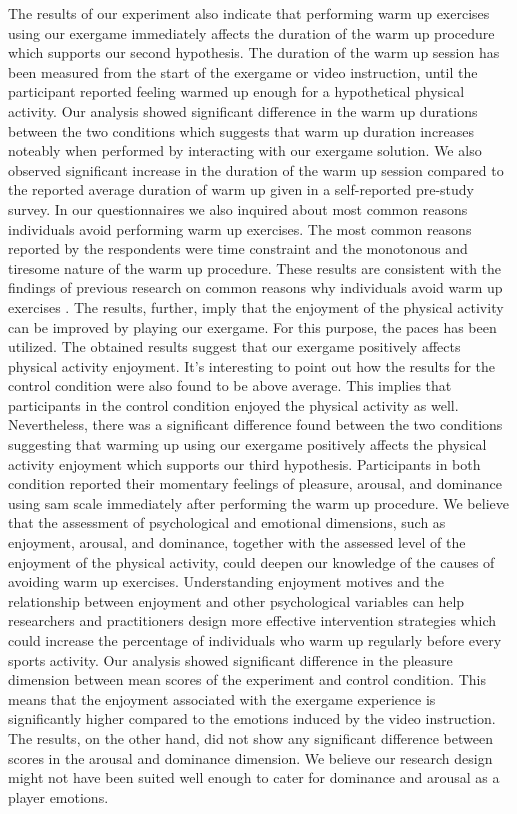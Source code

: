 The results of our experiment also indicate that performing warm up exercises using our exergame immediately affects the duration of the warm up procedure which supports our second hypothesis. The duration of the warm up session has been measured from the start of the exergame or video instruction, until the participant reported feeling warmed up enough for a hypothetical physical activity. Our analysis showed significant difference in the warm up durations between the two conditions which suggests that warm up duration increases noteably when performed by interacting with our exergame solution. We also observed significant increase in the duration of the warm up session compared to the reported average duration of warm up given in a self-reported pre-study survey. In our questionnaires we also inquired about most common reasons individuals avoid performing warm up exercises. The most common reasons reported by the respondents were time constraint and the monotonous and tiresome nature of the warm up procedure. These results are consistent with the findings of previous research on common reasons why individuals avoid warm up exercises \cite{fradkin2010effects}. The results, further, imply that the enjoyment of the physical activity can be improved by playing our exergame. For this purpose, the \acrlong{paces} has been utilized. The obtained results suggest that our exergame positively affects physical activity enjoyment. It's interesting to point out how the results for the control condition were also found to be above average. This implies that participants in the control condition enjoyed the physical activity as well.  Nevertheless, there was a significant difference found between the two conditions suggesting that warming up using our exergame positively affects the physical activity enjoyment which supports our third hypothesis. Participants  in both condition reported their momentary feelings of pleasure, arousal, and dominance using  \acrlong{sam} scale immediately after performing the warm up procedure. We believe that the assessment of psychological and emotional dimensions, such as enjoyment, arousal, and dominance, together with the assessed level of the enjoyment of the physical activity, could deepen our knowledge of the causes of avoiding warm up exercises. Understanding enjoyment motives and the relationship between enjoyment and other psychological variables can help researchers and practitioners design more effective intervention strategies which could increase the percentage of individuals who warm up regularly before every sports activity. Our analysis showed significant difference in the pleasure dimension between mean scores of the experiment and control condition. This means that the enjoyment associated with the exergame experience is significantly higher compared to the emotions induced by the video instruction. The results, on the other hand, did not show any significant difference between scores in the arousal and dominance dimension. We believe our research design might not have been suited well enough to cater for dominance and arousal as a player emotions.\\\\\\
